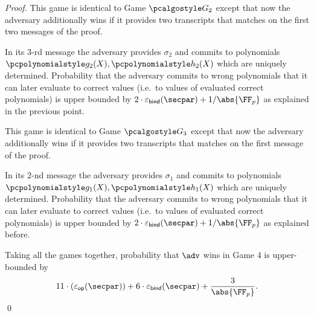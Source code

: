 {{\begin{proof}
   This game is identical to Game $\game{2}$ except that now the
  adversary additionally wins if it provides two transcripts that matches on the
  first two messages of the proof.

   In its $3$-rd message the adversary
  provides $\sigma_2$ and commits to polynomials $\p{g_2} (X), \p{h_2} (X)$ which are
  uniquely determined. Probability that the adversary commits to wrong polynomials that it
  can later evaluate to correct values (i.e.~to values of evaluated correct polynomials)
  is upper bounded by $2 \cdot \epsbind (\secpar) + 1 / \abs{\FF_p}$ as explained in the
  previous point.

    This game is identical to Game $\game{3}$ except that now the
  adversary additionally wins if it provides two transcripts that matches on the
  first message of the proof.

   In its $2$-nd message the adversary
  provides $\sigma_1$ and commits to polynomials $\p{g_1} (X), \p{h_1} (X)$ which are
  uniquely determined. Probability that the adversary commits to wrong polynomials that it
  can later evaluate to correct values (i.e.~to values of evaluated correct polynomials)
  is upper bounded by $2 \cdot \epsbind (\secpar) + 1 / \abs{\FF_p}$ as explained before.
  
   Taking all the games together, probability that $\adv$ wins
  in Game 4 is upper-bounded by
  \[
    11 \cdot (\epsop (\secpar)) + 6 \cdot \epsbind (\secpar) + \frac{3}{\abs{\FF_p}}.
  \]
  \qed
\end{proof}
}}

